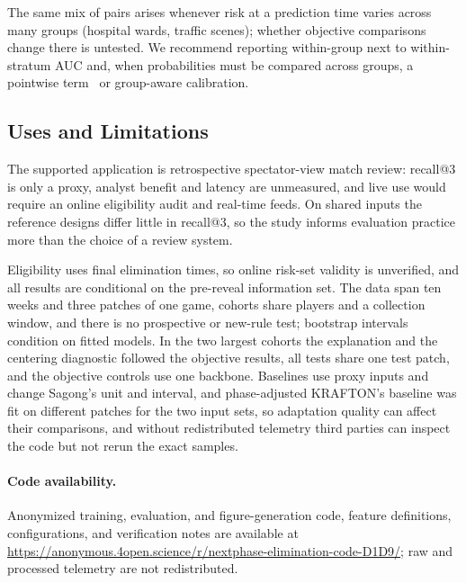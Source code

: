\documentclass[sigconf,anonymous]{acmart}
\newcommand{\artifacturl}{\url{https://anonymous.4open.science/r/nextphase-elimination-code-D1D9/}}
\begin{document}
The same mix of pairs arises whenever risk at a prediction time varies across many groups (hospital wards, traffic scenes); whether objective comparisons change there is untested. We recommend reporting within-group next to within-stratum AUC and, when probabilities must be compared across groups, a pointwise term~\cite{Bai23} or group-aware calibration.

\subsection{Uses and Limitations}
\label{sec:discussion:limits}
The supported application is retrospective spectator-view match review: recall@3 is only a proxy, analyst benefit and latency are unmeasured, and live use would require an online eligibility audit and real-time feeds. On shared inputs the reference designs differ little in recall@3, so the study informs evaluation practice more than the choice of a review system.

Eligibility uses final elimination times, so online risk-set validity is unverified, and all results are conditional on the pre-reveal information set. The data span ten weeks and three patches of one game, cohorts share players and a collection window, and there is no prospective or new-rule test; bootstrap intervals condition on fitted models. In the two largest cohorts the explanation and the centering diagnostic followed the objective results, all tests share one test patch, and the objective controls use one backbone. Baselines use proxy inputs and change Sagong's unit and interval, and phase-adjusted KRAFTON's baseline was fit on different patches for the two input sets, so adaptation quality can affect their comparisons, and without redistributed telemetry third parties can inspect the code but not rerun the exact samples.

\paragraph{Code availability.}
Anonymized training, evaluation, and figure-generation code, feature definitions, configurations, and verification notes are available at \artifacturl{}; raw and processed telemetry are not redistributed.
\end{document}
